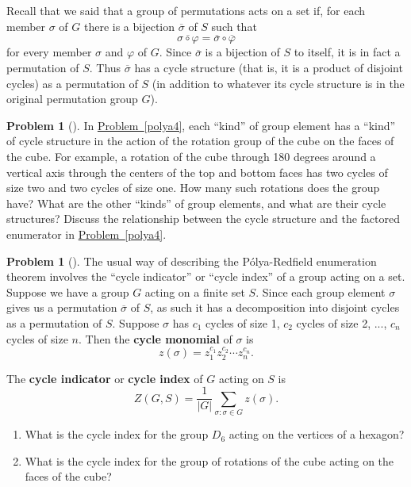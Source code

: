 \documentclass[10pt,]{book}
\newcommand{\terminology}[1]{\textbf{#1}}
\theoremstyle{plain}
\theoremstyle{definition}
\newtheorem{activity}[project]{Problem}
\theoremstyle{definition}
\numberwithin{equation}{chapter}
\begin{document}
Recall that we said that a group of permutations acts on a set if, for each member \(\sigma\) of \(G\) there is a bijection \(\overline{\sigma}\) of \(S\) such that%
\begin{equation*}
\overline{\sigma\circ\varphi} = \overline{\sigma}\circ\overline{\varphi}
\end{equation*}
for every member \(\sigma\) and \(\varphi\) of \(G\). Since \(\overline{\sigma}\) is a bijection of \(S\) to itself, it is in fact a permutation of \(S\). Thus \(\overline{\sigma}\) has a cycle structure (that is, it is a product of disjoint cycles) as a permutation of \(S\) (in addition to whatever its cycle structure is in the original permutation group \(G\)).%
\begin{activity}[] \label{activity-319}
In \hyperref[polya4]{Problem~\ref{polya4}}, each ``kind'' of group element has a ``kind'' of cycle structure in the action of the rotation group of the cube on the faces of the cube. For example, a rotation of the cube through 180 degrees around a vertical axis through the centers of the top and bottom faces has two cycles of size two and two cycles of size one. How many such rotations does the group have? What are the other ``kinds'' of group elements, and what are their cycle structures? Discuss the relationship between the cycle structure and the factored enumerator in \hyperref[polya4]{Problem~\ref{polya4}}.%
\end{activity}
\begin{activity}[] \label{activity-320}
The usual way of describing the Pólya-Redfield enumeration theorem involves the ``cycle indicator'' or ``cycle index'' of a group acting on a set. Suppose we have a group \(G\) acting on a finite set \(S\). Since each group element \(\sigma\) gives us a permutation \(\overline{\sigma}\) of \(S\), as such it has a decomposition into disjoint cycles as a permutation of \(S\). Suppose \(\sigma\) has \(c_1\) cycles of size 1, \(c_2\) cycles of size 2, ..., \(c_n\) cycles of size \(n\). Then the \terminology{cycle monomial} of \(\sigma\) is%
\begin{equation*}
z(\sigma) = z_1^{c_1}z_2^{c_2}\cdots z_n^{c_n}.
\end{equation*}
%
\par
The \terminology{cycle indicator} or \terminology{cycle index} of \(G\) acting on \(S\) is%
\begin{equation*}
Z(G,S) = \frac{1}{|G|}\sum_{\sigma: \sigma \in G} z(\sigma).
\end{equation*}
%
\begin{enumerate}[font=\bfseries,label=(\alph*),ref=\alph*]
\item\label{task-233} \marginsymbol[-2.5em]{} What is the cycle index for the group \(D_6\) acting on the vertices of a hexagon?%
\item\label{task-234} \marginsymbol[-2.5em]{} What is the cycle index for the group of rotations of the cube acting on the faces of the cube?%
\end{enumerate}
\end{activity}
\end{document}
